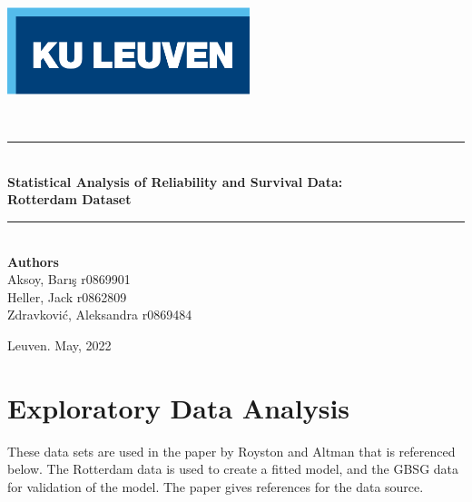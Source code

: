 \documentclass[
]{article}
\author{}
\date{\vspace{-2.5em}}
\begin{document}
\begin{titlepage}
\newcommand{\HRule}{\rule{\linewidth}{0.5mm}} %

\thispagestyle{empty}

\vfill
\begin{center}
\includegraphics[width=200pt,  keepaspectratio]{logo.png}
\end{center}

\vspace*{45mm}
\begin{center}
{\LARGE \textmd{}}\\\vspace*{3mm}
\Huge\HRule\\[0.4cm]{\textbf{Statistical Analysis of Reliability and Survival Data:\\
Rotterdam Dataset}}
\HRule\\[100pt] %

\large \textbf{Authors} \\
\large \textmd{
    Aksoy, Barış r0869901 \\
   Heller, Jack r0862809 \\
    Zdravković, Aleksandra r0869484
} \\\vspace*{5mm}

\vfill

\centerline{\large \textmd{Leuven. May, 2022}}
\end{center}

\end{titlepage}

\section{Exploratory Data Analysis}

These data sets are used in the paper by Royston and Altman that is
referenced below. The Rotterdam data is used to create a fitted model,
and the GBSG data for validation of the model. The paper gives
references for the data source.
\end{document}
